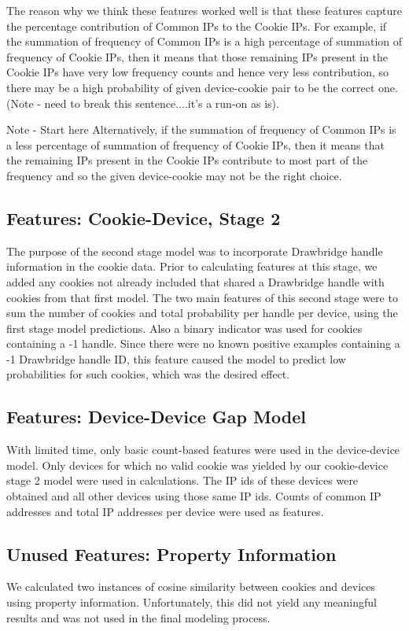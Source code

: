 \documentclass[9pt, journal]{IEEEtran}
\begin{document}
The reason why we think these features worked well is that these features capture the percentage contribution of Common IPs to the Cookie IPs. 
For example, if the summation of frequency of Common IPs is a high percentage of summation of frequency of Cookie IPs, then it means that those remaining IPs present in the Cookie IPs have very low frequency counts and hence very less contribution, so there may be a high probability of given device-cookie pair to be the correct one. (Note - need to break this sentence....it's a run-on as is).

Note - Start here
Alternatively, if the summation of frequency of Common IPs is a less percentage of summation of frequency of Cookie IPs, then it means that the remaining IPs present in the Cookie IPs contribute to most part of the frequency and so the given device-cookie may not be the right choice.

\subsection{Features: Cookie-Device, Stage 2}
The purpose of the second stage model was to incorporate Drawbridge handle information in the cookie data. 
Prior to calculating features at this stage, we added any cookies not already included that shared a Drawbridge handle with cookies from that first model.
The two main features of this second stage were to sum the number of cookies and total probability per handle per device, using the first stage model predictions.
Also a binary indicator was used for cookies containing a -1 handle. 
Since there were no known positive examples containing a -1 Drawbridge handle ID, this feature caused the model to predict low probabilities for such cookies, which was the desired effect.


\subsection{Features: Device-Device Gap Model}
With limited time, only basic count-based features were used in the device-device model.
Only devices for which no valid cookie was yielded by our cookie-device stage 2 model were used in calculations. 
The IP ids of these devices were obtained and all other devices using those same IP ids. 
Counts of common IP addresses and total IP addresses per device were used as features.

\subsection{Unused Features: Property Information}
We calculated two instances of cosine similarity between cookies and devices using property information. Unfortunately, this did not yield any meaningful results and was not used in the final modeling process.
\end{document}
